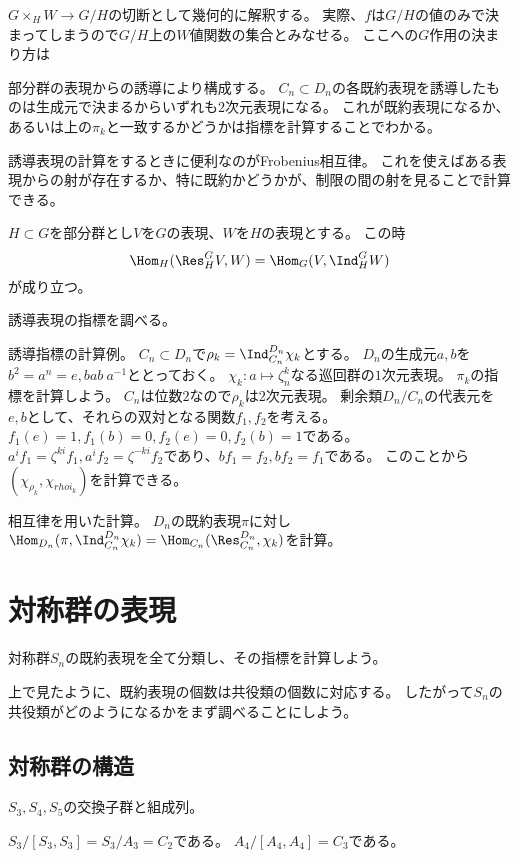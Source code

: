 \documentclass{jsarticle}
\begin{document}
$G\times_HW\to G/H$の切断として幾何的に解釈する。
実際、$f$は$G/H$の値のみで決まってしまうので$G/H$上の$W$値関数の集合とみなせる。
ここへの$G$作用の決まり方は

部分群の表現からの誘導により構成する。
$C_n\subset D_n$の各既約表現を誘導したものは生成元で決まるからいずれも$2$次元表現になる。
これが既約表現になるか、あるいは上の$\pi_k$と一致するかどうかは指標を計算することでわかる。

誘導表現の計算をするときに便利なのがFrobenius相互律。
これを使えばある表現からの射が存在するか、特に既約かどうかが、制限の間の射を見ることで計算できる。
\begin{thm}[Frobenius相互律]
$H\subset G$を部分群とし$V$を$G$の表現、$W$を$H$の表現とする。
この時
\[
\Hom_H(\Res^G_HV,W)=\Hom_G(V,\Ind^G_HW)
\]
が成り立つ。
\end{thm}

誘導表現の指標を調べる。

\begin{eg}
誘導指標の計算例。
$C_n\subset D_n$で$\rho_k=\Ind^{D_n}_{C_n}\chi_k$とする。
$D_n$の生成元$a,b$を$b^2=a^n=e, bab~a^{-1}$ととっておく。
$\chi_k\colon a\mapsto \zeta_n^k$なる巡回群の$1$次元表現。
$\pi_k$の指標を計算しよう。
$C_n$は位数$2$なので$\rho_k$は$2$次元表現。
剰余類$D_n/C_n$の代表元を$e, b$として、それらの双対となる関数$f_1, f_2$を考える。
$f_1(e)=1, f_1(b)=0, f_2(e)=0, f_2(b)=1$である。
$a^if_1=\zeta^{ki}f_1, a^if_2=\zeta^{-ki}f_2$であり、$bf_1=f_2, bf_2=f_1$である。
このことから$(\chi_{\rho_k},\chi_{rhoi_k})$を計算できる。

相互律を用いた計算。
$D_n$の既約表現$\pi$に対し$\Hom_{D_n}(\pi,\Ind^{D_n}_{C_n}\chi_k)=\Hom_{C_n}(\Res^{D_n}_{C_n},\chi_k)$を計算。
\end{eg}

\section{対称群の表現}
対称群$S_n$の既約表現を全て分類し、その指標を計算しよう。

上で見たように、既約表現の個数は共役類の個数に対応する。
したがって$S_n$の共役類がどのようになるかをまず調べることにしよう。

\subsection{対称群の構造}
$S_3, S_4, S_5$の交換子群と組成列。

$S_3/[S_3,S_3]=S_3/A_3=C_2$である。
$A_4/[A_4,A_4]=C_3$である。
\end{document}
